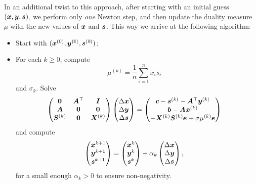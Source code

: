 In an additional twist to this approach, after starting with an initial guess $(\bm{x},\bm{y},\bm{s})$, we perform only {\em one} Newton step, and then update the duality measure $\mu$ with the new values of $\bm{x}$ and $\bm{s}$. This way we arrive at the following algorithm: 
\begin{itemize}
 \item Start with $(\bm{x}^{(0)},\bm{y}^{(0)},\bm{s}^{(0)})$;
 \item For each $k\geq 0$, compute 
 \begin{equation*}
  \mu^{(k)} = \frac{1}{n} \sum_{i=1}^n x_is_i
 \end{equation*}
and $\sigma_k$. Solve
\begin{equation*}
 \begin{pmatrix}
  \bm{0} & \bm{A}^{\top} & \bm{I} \\
  \bm{A} & \bm{0} & \bm{0} \\
  \bm{S}^{(k)} & \bm{0} & \bm{X}^{(k)}
 \end{pmatrix}
\begin{pmatrix} \Delta\bm{x}\\ \Delta \bm{y}\\ \Delta\bm{s} \end{pmatrix} = \begin{pmatrix} \bm{c}-\bm{s}^{(k)}-\bm{A}^{\top}\bm{y}^{(k)}\\ \bm{b}-\bm{A}\bm{x}^{(k)}\\ -\bm{X}^{(k)}\bm{S}^{(k)}\bm{e}+\sigma \mu^{(k)}\bm{e}\end{pmatrix}
\end{equation*}
and compute
\begin{equation*}
\begin{pmatrix} \bm{x}^{k+1}\\ \bm{y}^{k+1}\\ \bm{s}^{k+1}\end{pmatrix}= \begin{pmatrix} \bm{x}^{k}\\ \bm{y}^{k}\\ \bm{s}^{k}\end{pmatrix} +\alpha_k \begin{pmatrix} \Delta\bm{x}\\ \Delta \bm{y}\\ \Delta\bm{s} \end{pmatrix},
 \end{equation*}
for a small enough $\alpha_k>0$ to ensure non-negativity.
\end{itemize}

